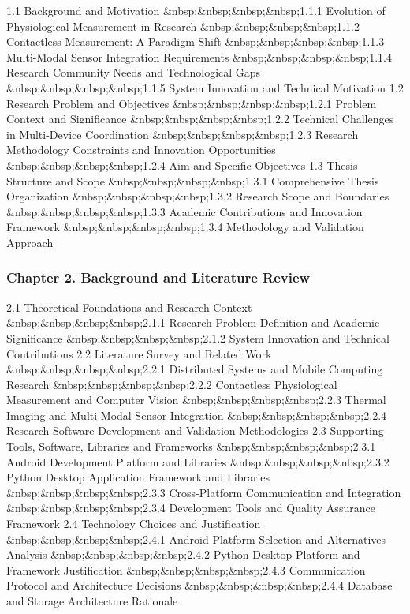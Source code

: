 \documentclass[11pt,a4paper]{report}
\begin{document}
1.1 Background and Motivation
\&nbsp;\&nbsp;\&nbsp;\&nbsp;1.1.1 Evolution of Physiological Measurement in Research
\&nbsp;\&nbsp;\&nbsp;\&nbsp;1.1.2 Contactless Measurement: A Paradigm Shift
\&nbsp;\&nbsp;\&nbsp;\&nbsp;1.1.3 Multi-Modal Sensor Integration Requirements
\&nbsp;\&nbsp;\&nbsp;\&nbsp;1.1.4 Research Community Needs and Technological Gaps
\&nbsp;\&nbsp;\&nbsp;\&nbsp;1.1.5 System Innovation and Technical Motivation
1.2 Research Problem and Objectives
\&nbsp;\&nbsp;\&nbsp;\&nbsp;1.2.1 Problem Context and Significance
\&nbsp;\&nbsp;\&nbsp;\&nbsp;1.2.2 Technical Challenges in Multi-Device Coordination
\&nbsp;\&nbsp;\&nbsp;\&nbsp;1.2.3 Research Methodology Constraints and Innovation Opportunities
\&nbsp;\&nbsp;\&nbsp;\&nbsp;1.2.4 Aim and Specific Objectives
1.3 Thesis Structure and Scope
\&nbsp;\&nbsp;\&nbsp;\&nbsp;1.3.1 Comprehensive Thesis Organization
\&nbsp;\&nbsp;\&nbsp;\&nbsp;1.3.2 Research Scope and Boundaries
\&nbsp;\&nbsp;\&nbsp;\&nbsp;1.3.3 Academic Contributions and Innovation Framework
\&nbsp;\&nbsp;\&nbsp;\&nbsp;1.3.4 Methodology and Validation Approach

\subsubsection{Chapter 2. Background and Literature Review}

2.1 Theoretical Foundations and Research Context
\&nbsp;\&nbsp;\&nbsp;\&nbsp;2.1.1 Research Problem Definition and Academic Significance
\&nbsp;\&nbsp;\&nbsp;\&nbsp;2.1.2 System Innovation and Technical Contributions
2.2 Literature Survey and Related Work
\&nbsp;\&nbsp;\&nbsp;\&nbsp;2.2.1 Distributed Systems and Mobile Computing Research
\&nbsp;\&nbsp;\&nbsp;\&nbsp;2.2.2 Contactless Physiological Measurement and Computer Vision
\&nbsp;\&nbsp;\&nbsp;\&nbsp;2.2.3 Thermal Imaging and Multi-Modal Sensor Integration
\&nbsp;\&nbsp;\&nbsp;\&nbsp;2.2.4 Research Software Development and Validation Methodologies
2.3 Supporting Tools, Software, Libraries and Frameworks
\&nbsp;\&nbsp;\&nbsp;\&nbsp;2.3.1 Android Development Platform and Libraries
\&nbsp;\&nbsp;\&nbsp;\&nbsp;2.3.2 Python Desktop Application Framework and Libraries
\&nbsp;\&nbsp;\&nbsp;\&nbsp;2.3.3 Cross-Platform Communication and Integration
\&nbsp;\&nbsp;\&nbsp;\&nbsp;2.3.4 Development Tools and Quality Assurance Framework
2.4 Technology Choices and Justification
\&nbsp;\&nbsp;\&nbsp;\&nbsp;2.4.1 Android Platform Selection and Alternatives Analysis
\&nbsp;\&nbsp;\&nbsp;\&nbsp;2.4.2 Python Desktop Platform and Framework Justification
\&nbsp;\&nbsp;\&nbsp;\&nbsp;2.4.3 Communication Protocol and Architecture Decisions
\&nbsp;\&nbsp;\&nbsp;\&nbsp;2.4.4 Database and Storage Architecture Rationale
\end{document}
